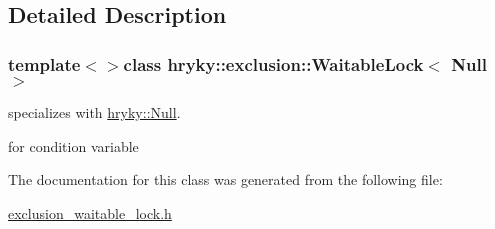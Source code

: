 \subsection{Detailed Description}
\subsubsection*{template$<$$>$class hryky\-::exclusion\-::\-Waitable\-Lock$<$ Null $>$}

specializes with \hyperlink{classhryky_1_1_null}{hryky\-::\-Null}. 


\begin{DoxyItemize}
\item for condition variable 
\end{DoxyItemize}

The documentation for this class was generated from the following file\-:\begin{DoxyCompactItemize}
\item 
\hyperlink{exclusion__waitable__lock_8h}{exclusion\-\_\-waitable\-\_\-lock.\-h}\end{DoxyCompactItemize}
